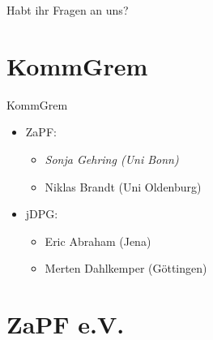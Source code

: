 \documentclass[compress, aspectratio=169]{beamer}
\begin{document}
\begin{frame}[plain]
  \begin{center}
    \Huge Habt ihr Fragen an uns?
    \end{center}
\end{frame}

\section{KommGrem}

\begin{frame}{KommGrem}
  \begin{itemize}
  \item[] ZaPF:
    \begin{itemize}
    \item \emph{Sonja Gehring (Uni Bonn)}
    \item Niklas Brandt (Uni Oldenburg)
    \end{itemize}
  \item[] jDPG:
    \begin{itemize}
    \item Eric Abraham (Jena)
    \item Merten Dahlkemper (Göttingen)
    \end{itemize}
  \end{itemize}
  \vspace{0.5cm}
\end{frame}

\section{ZaPF e.V.}
\end{document}
